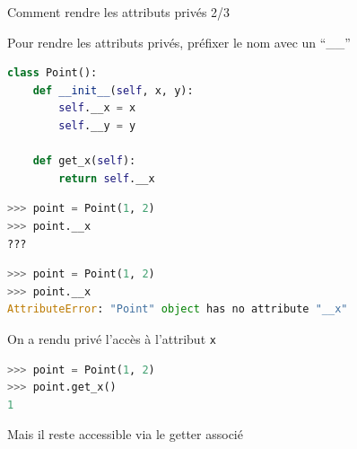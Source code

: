 \documentclass[10pt]{beamer}
\begin{document}
\begin{frame}[fragile]{Comment rendre les attributs privés 2/3}

  Pour rendre les attributs privés, préfixer le nom avec un ``\_\_''

  \begin{lstlisting}[language=Python, numbers=none]
class Point():
    def __init__(self, x, y):
        self.__x = x
        self.__y = y

    def get_x(self):
        return self.__x
\end{lstlisting}

  \begin{overprint}





\begin{lstlisting}[language=Python, numbers=none]
>>> point = Point(1, 2)
>>> point.__x
???
\end{lstlisting}




\begin{lstlisting}[language=Python, numbers=none]
>>> point = Point(1, 2)
>>> point.__x
AttributeError: "Point" object has no attribute "__x"
\end{lstlisting}
  On a rendu privé l'accès à l'attribut \texttt{x}

\begin{lstlisting}[language=Python, numbers=none]
>>> point = Point(1, 2)
>>> point.get_x()
1
\end{lstlisting}
  Mais il reste accessible via le getter associé

  \end{overprint}

    \end{frame}
\end{document}
